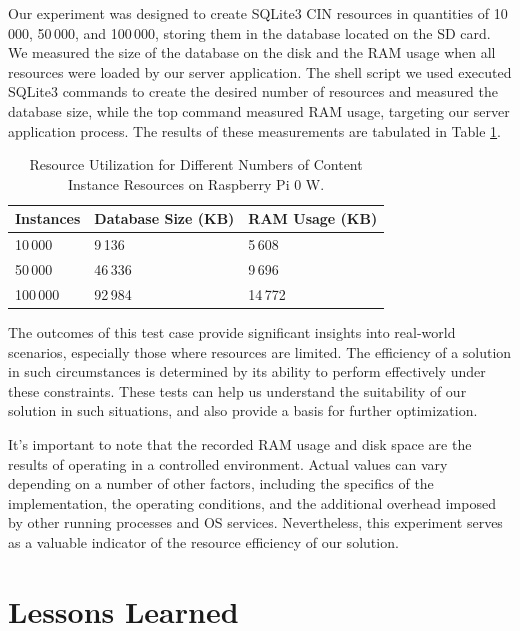 \documentclass[a4paper,fleqn]{cas-dc}
\begin{document}
Our experiment was designed to create SQLite3 CIN resources in quantities of 10\,000, 50\,000, and 100\,000, storing them in the database located on the SD card. We measured the size of the database on the disk and the RAM usage when all resources were loaded by our server application. The shell script we used executed SQLite3 commands to create the desired number of resources and measured the database size, while the top command measured RAM usage, targeting our server application process. The results of these measurements are tabulated in Table \ref{tab:ResourceUtilization}.

\begin{table}[h]
\scriptsize
\centering
\caption{Resource Utilization for Different Numbers of Content Instance Resources on Raspberry Pi 0 W.}
\label{tab:ResourceUtilization}
\begin{tabular}{ p{1.5cm} p{2.5cm} p{2.5cm} }
\hline
\textbf{Instances} & \textbf{Database Size (KB)} & \textbf{RAM Usage (KB)} \\
\hline \hline
10\,000 & 9\,136 & 5\,608 \\
50\,000 & 46\,336 & 9\,696 \\
100\,000 & 92\,984 & 14\,772 \\
\hline
\end{tabular}
\end{table}

The outcomes of this test case provide significant insights into real-world scenarios, especially those where resources are limited. The efficiency of a solution in such circumstances is determined by its ability to perform effectively under these constraints. These tests can help us understand the suitability of our solution in such situations, and also provide a basis for further optimization.

It's important to note that the recorded RAM usage and disk space are the results of operating in a controlled environment. Actual values can vary depending on a number of other factors, including the specifics of the implementation, the operating conditions, and the additional overhead imposed by other running processes and OS services. Nevertheless, this experiment serves as a valuable indicator of the resource efficiency of our solution.

\section{Lessons Learned}
\label{sec:lessonsLearned}
\end{document}
